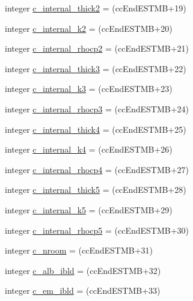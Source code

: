 \begin{DoxyCompactItemize}
\item 
integer \hyperlink{namespaceallocatearray_a025160042f9583347ec34744280846ef}{c\+\_\+internal\+\_\+thick2} = (cc\+End\+E\+S\+T\+MB+19)
\item 
integer \hyperlink{namespaceallocatearray_ac07e6d3eb8a34554cf3e72d8aaf64393}{c\+\_\+internal\+\_\+k2} = (cc\+End\+E\+S\+T\+MB+20)
\item 
integer \hyperlink{namespaceallocatearray_a1f3c275526104fca707a950b63b52287}{c\+\_\+internal\+\_\+rhocp2} = (cc\+End\+E\+S\+T\+MB+21)
\item 
integer \hyperlink{namespaceallocatearray_a5948fd07dadcd73d96ce4235456b468d}{c\+\_\+internal\+\_\+thick3} = (cc\+End\+E\+S\+T\+MB+22)
\item 
integer \hyperlink{namespaceallocatearray_a452b162600f15987ceaa36c9a01186b0}{c\+\_\+internal\+\_\+k3} = (cc\+End\+E\+S\+T\+MB+23)
\item 
integer \hyperlink{namespaceallocatearray_aab52371de295d084f7c7c2e80eeeafeb}{c\+\_\+internal\+\_\+rhocp3} = (cc\+End\+E\+S\+T\+MB+24)
\item 
integer \hyperlink{namespaceallocatearray_a9f1c0ff39a8c3c66f6c9faeb7bb341d1}{c\+\_\+internal\+\_\+thick4} = (cc\+End\+E\+S\+T\+MB+25)
\item 
integer \hyperlink{namespaceallocatearray_a3c230d3db37cc9e9049260266500c799}{c\+\_\+internal\+\_\+k4} = (cc\+End\+E\+S\+T\+MB+26)
\item 
integer \hyperlink{namespaceallocatearray_a1fd0fd9b11afc790bcbd29f2ecab1ba2}{c\+\_\+internal\+\_\+rhocp4} = (cc\+End\+E\+S\+T\+MB+27)
\item 
integer \hyperlink{namespaceallocatearray_a6b14bf47c27bd742277d65f2f6623ae4}{c\+\_\+internal\+\_\+thick5} = (cc\+End\+E\+S\+T\+MB+28)
\item 
integer \hyperlink{namespaceallocatearray_ae5939d57a10a1bdad70a9a8db727ce15}{c\+\_\+internal\+\_\+k5} = (cc\+End\+E\+S\+T\+MB+29)
\item 
integer \hyperlink{namespaceallocatearray_a00074a8f0a1de06747dd7c674cea09a6}{c\+\_\+internal\+\_\+rhocp5} = (cc\+End\+E\+S\+T\+MB+30)
\item 
integer \hyperlink{namespaceallocatearray_a40863099afa066fca952f172e733261c}{c\+\_\+nroom} = (cc\+End\+E\+S\+T\+MB+31)
\item 
integer \hyperlink{namespaceallocatearray_ad603c0d1d8d800628db261e14e19a9fb}{c\+\_\+alb\+\_\+ibld} = (cc\+End\+E\+S\+T\+MB+32)
\item 
integer \hyperlink{namespaceallocatearray_ac7604ddd8f3d387cfcb277d2576a5374}{c\+\_\+em\+\_\+ibld} = (cc\+End\+E\+S\+T\+MB+33)

\end{DoxyCompactItemize}
